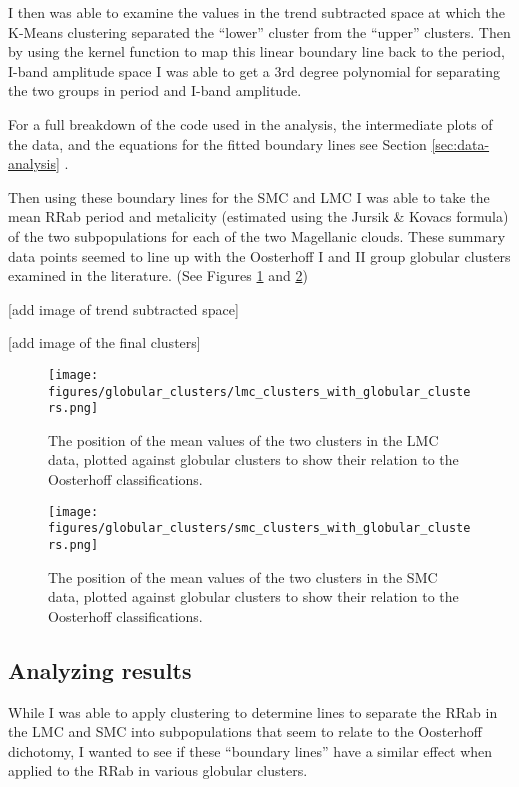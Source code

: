 \documentclass[]{article}
\begin{document}
I then was able to examine the values in the trend subtracted space at which the K-Means clustering separated the ``lower'' cluster from the ``upper'' clusters. Then by using the kernel function to map this linear boundary line back to the period, I-band amplitude space I was able to get a 3rd degree polynomial for separating the two groups in period and I-band amplitude.

For a full breakdown of the code used in the analysis, the intermediate plots of the data, and the equations for the fitted boundary lines see Section \ref{sec:data-analysis} .

Then using these boundary lines for the SMC and LMC I was able to take the mean RRab period and metalicity (estimated using the Jursik \& Kovacs formula) of the two subpopulations for each of the two Magellanic clouds. These summary data points seemed to line up with the Oosterhoff I and II group globular clusters examined in the literature. (See Figures \ref{fig:lmc_clustering_with_gcs} and \ref{fig:smc_clustering_with_gcs})

[add image of trend subtracted space]

[add image of the final clusters]

\begin{figure}
	\centering
	\texttt{[image: figures/globular\_clusters/lmc\_clusters\_with\_globular\_clusters.png]}
	\caption{The position of the mean values of the two clusters in the LMC data, plotted against globular clusters to show their relation to the Oosterhoff classifications.}
	\label{fig:lmc_clustering_with_gcs}
\end{figure}

\begin{figure}
	\centering
	\texttt{[image: figures/globular\_clusters/smc\_clusters\_with\_globular\_clusters.png]}
	\caption{The position of the mean values of the two clusters in the SMC data, plotted against globular clusters to show their relation to the Oosterhoff classifications.}
	\label{fig:smc_clustering_with_gcs}
\end{figure}

\subsection{Analyzing results}
While I was able to apply clustering to determine lines to separate the RRab in the LMC and SMC into subpopulations that seem to relate to the Oosterhoff dichotomy, I wanted to see if these “boundary lines” have a similar effect when applied to the RRab in various globular clusters.
\end{document}

